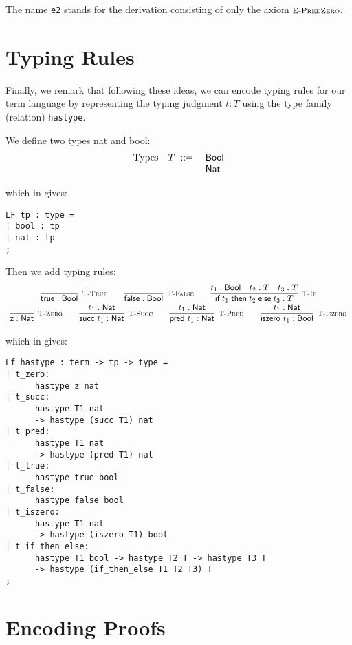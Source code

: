 The name \lstinline!e2! stands for the derivation consisting of only
the axiom $\textsc{\footnotesize E-PredZero}$.

\section{Typing Rules}

Finally, we remark that following these ideas, we can encode typing rules for
our term language by representing the typing judgment $t : T$ using the type
family (relation) \lstinline!hastype!.

We define two types nat and bool:
\[
\begin{array}{lll}
\mbox{Types} & T \;\mathrel{::=}\; & \textsf{Bool} \\
             &          & \textsf{Nat}
\end{array}
\]

which in \beluga gives:
\begin{lstlisting}
LF tp : type =
| bool : tp
| nat : tp
;
\end{lstlisting}

Then we add typing rules:
\[
\begin{array}{c}
  \infer[\TTrue]{\tmtrue \hastype \Bool}{} \qquad
  \infer[\TFalse]{\tmfalse \hastype \Bool}{} \qquad
  \infer[\TIf]{\tmif{t_1}{t_2}{t_3} \hastype T}{t_1 \hastype \Bool & t_2 \hastype T & t_3 \hastype T}
\\
  \infer[\TZero]{\tmzero \hastype \Nat}{}\qquad
  \infer[\TSucc]{\tmsucc t_1 \hastype \Nat}{t_1 \hastype \Nat} \qquad
  \infer[\TPred]{\tmpred t_1 \hastype \Nat}{t_1 \hastype \Nat} \qquad
  \infer[\TIsZero]{\tmiszero t_1 \hastype \Bool}{t_1 \hastype \Nat}
\\
\end{array}
\]

which in \beluga gives:
\begin{lstlisting}
Lf hastype : term -> tp -> type =
| t_zero:
      hastype z nat
| t_succ:
      hastype T1 nat
      -> hastype (succ T1) nat
| t_pred:
      hastype T1 nat
      -> hastype (pred T1) nat
| t_true:
      hastype true bool
| t_false:
      hastype false bool
| t_iszero:
      hastype T1 nat
      -> hastype (iszero T1) bool
| t_if_then_else:
      hastype T1 bool -> hastype T2 T -> hastype T3 T
      -> hastype (if_then_else T1 T2 T3) T
;
\end{lstlisting} %

\section{Encoding Proofs}


